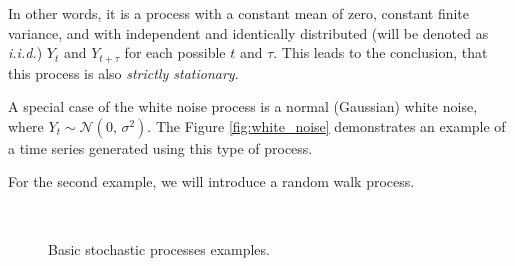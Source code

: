 In other words, it is a process with a constant mean of zero, constant finite variance, and with independent and identically distributed (will be denoted as \textit{i.i.d.}) $Y_{t}$ and $Y_{t+\tau}$ for each possible $t$ and $\tau$. This leads to the conclusion, that this process is also \textit{strictly stationary}.

A special case of the white noise process is a normal (Gaussian) white noise, where $Y_{t} \sim \mathcal{N}(0,\,\sigma^{2})$. The Figure \ref{fig:white_noise} demonstrates an example of a time series generated using this type of process.

For the second example, we will introduce a random walk process. 

\begin{figure}[!htb]
  \centering
   \\
  \caption{Basic stochastic processes examples.} \label{fig:b_ex_ts}
\end{figure}

